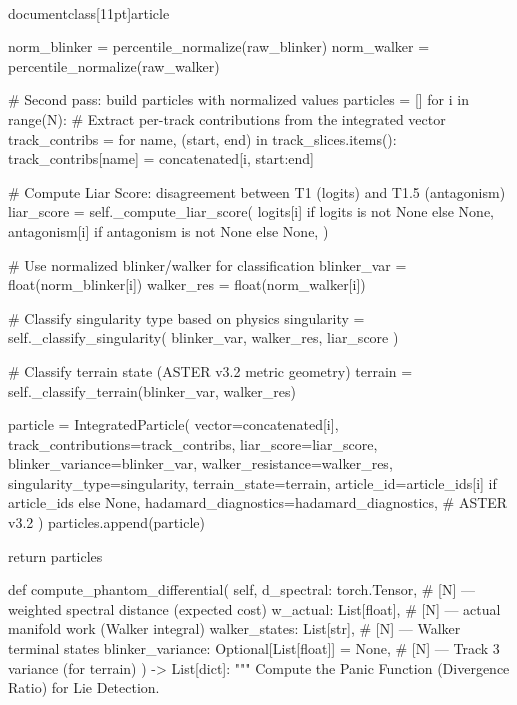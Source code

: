 \\documentclass[11pt]{article}
\begin{document}
\begin{CodeBlock}
        norm_blinker = percentile_normalize(raw_blinker)
        norm_walker = percentile_normalize(raw_walker)

        # Second pass: build particles with normalized values
        particles = []
        for i in range(N):
            # Extract per-track contributions from the integrated vector
            track_contribs = {}
            for name, (start, end) in track_slices.items():
                track_contribs[name] = concatenated[i, start:end]

            # Compute Liar Score: disagreement between T1 (logits) and T1.5 (antagonism)
            liar_score = self._compute_liar_score(
                logits[i] if logits is not None else None,
                antagonism[i] if antagonism is not None else None,
            )

            # Use normalized blinker/walker for classification
            blinker_var = float(norm_blinker[i])
            walker_res = float(norm_walker[i])

            # Classify singularity type based on physics
            singularity = self._classify_singularity(
                blinker_var, walker_res, liar_score
            )

            # Classify terrain state (ASTER v3.2 metric geometry)
            terrain = self._classify_terrain(blinker_var, walker_res)

            particle = IntegratedParticle(
                vector=concatenated[i],
                track_contributions=track_contribs,
                liar_score=liar_score,
                blinker_variance=blinker_var,
                walker_resistance=walker_res,
                singularity_type=singularity,
                terrain_state=terrain,
                article_id=article_ids[i] if article_ids else None,
                hadamard_diagnostics=hadamard_diagnostics,  # ASTER v3.2
            )
            particles.append(particle)

        return particles

    def compute_phantom_differential(
        self,
        d_spectral: torch.Tensor,  # [N] — weighted spectral distance (expected cost)
        w_actual: List[float],     # [N] — actual manifold work (Walker integral)
        walker_states: List[str],  # [N] — Walker terminal states
        blinker_variance: Optional[List[float]] = None,  # [N] — Track 3 variance (for terrain)
    ) -> List[dict]:
        """
        Compute the Panic Function (Divergence Ratio) for Lie Detection.


\end{CodeBlock}
\end{document}
